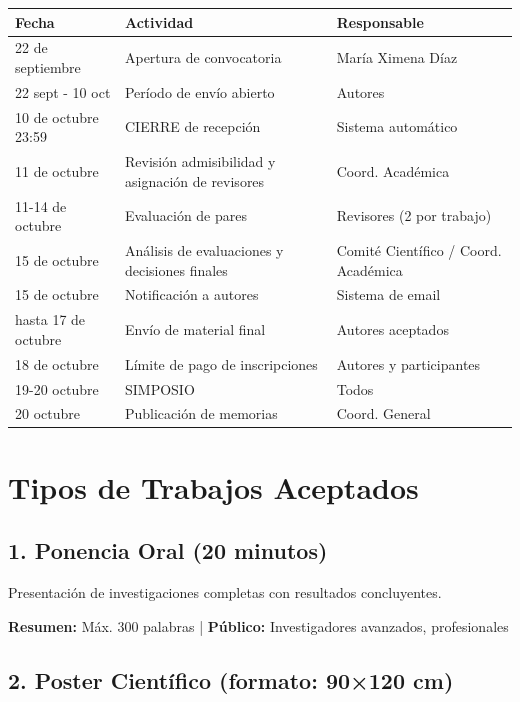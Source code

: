 \documentclass[12pt,a4paper]{article}
\begin{document}
\begin{table}[h]
\centering
\small
\begin{tabular}{|l|l|l|}
\hline
\rowcolor{verdeclaro}
\textbf{Fecha} & \textbf{Actividad} & \textbf{Responsable} \\
\hline
22 de septiembre & Apertura de convocatoria & María Ximena Díaz \\
\hline
22 sept - 10 oct & Período de envío abierto & Autores \\
\hline
10 de octubre 23:59 & CIERRE de recepción & Sistema automático \\
\hline
11 de octubre & Revisión admisibilidad y asignación de revisores & Coord. Académica \\
\hline
11-14 de octubre & Evaluación de pares & Revisores (2 por trabajo) \\
\hline
15 de octubre & Análisis de evaluaciones y decisiones finales & Comité Científico / Coord. Académica \\
\hline
15 de octubre & Notificación a autores & Sistema de email \\
\hline
hasta 17 de octubre & Envío de material final & Autores aceptados \\
\hline
18 de octubre & Límite de pago de inscripciones & Autores y participantes \\
\hline
19-20 octubre & SIMPOSIO & Todos \\
\hline
20 octubre & Publicación de memorias & Coord. General \\
\hline
\end{tabular}
\end{table}

\section{Tipos de Trabajos Aceptados}

\subsection{1. Ponencia Oral (20 minutos)}

Presentación de investigaciones completas con resultados concluyentes.

\textbf{Resumen:} Máx. 300 palabras | \textbf{Público:} Investigadores avanzados, profesionales

\subsection{2. Poster Científico (formato: 90×120 cm)}
\end{document}
